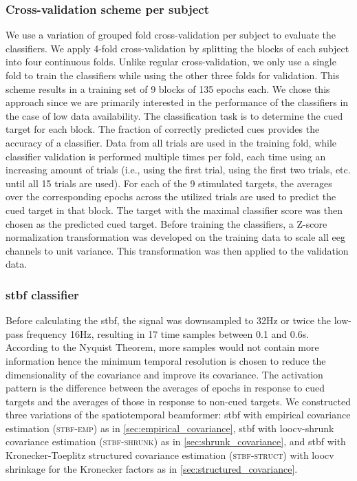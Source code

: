 	\subsubsection{Cross-validation scheme per subject}
	We use a variation of grouped fold cross-validation per subject to evaluate the classifiers.
	We apply 4-fold cross-validation by splitting the blocks of each subject into
	four continuous folds.
	Unlike regular cross-validation, we only use a single fold to train the
	classifiers while using the other three folds for validation.
	This scheme results in a training set of 9 blocks of 135 epochs each.
	We chose this approach since we are primarily interested in the performance of the classifiers in the case of low data availability.
	The classification task is to determine the cued target for each block.
	The fraction of correctly predicted cues provides the accuracy of a classifier.
	Data from all trials are used in the training fold, while classifier validation
	is performed multiple times per fold, each time using an increasing amount of
	trials (i.e., using the first trial, using the first two trials, etc. until all 15 trials
	are used).
	For each of the 9 stimulated targets, the averages over the corresponding epochs across
	the utilized trials are used to predict the cued target in that block.
	The target with the maximal classifier score was then chosen as the predicted
	cued target.
	Before training the classifiers, a Z-score normalization transformation was
	developed on the training data to scale all \ac{eeg} channels to unit variance.
	This transformation was then applied to the validation data.

  \subsubsection{\Acl{stbf} classifier}
	Before calculating the \ac{stbf}, the signal was downsampled to
	32Hz or twice the low-pass frequency 16Hz, resulting in 17 time samples
	between 0.1 and 0.6s. According to the Nyquist Theorem, more samples would not
	contain more information hence the minimum temporal resolution is chosen to reduce
	the dimensionality of the covariance and improve its covariance.
	The activation pattern is the difference between the averages of epochs in response to cued targets and the averages of those in response to non-cued targets.
	We constructed three variations of the spatiotemporal beamformer:
	\ac{stbf} with empirical covariance estimation (\textsc{stbf-emp}) as in
	\cref{sec:empirical_covariance}, \ac{stbf} with
	\ac{loocv}-shrunk covariance estimation (\textsc{stbf-shrunk}) as in
	\cref{sec:shrunk_covariance}, and \ac{stbf} with
	Kronecker-Toeplitz structured covariance estimation (\textsc{stbf-struct}) with \ac{loocv} shrinkage for
	the Kronecker factors as in \cref{sec:structured_covariance}.

